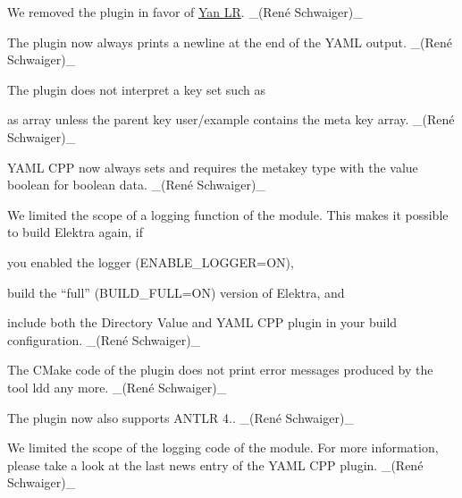 \begin{DoxyItemize}
\item We removed the plugin in favor of \hyperlink{autotoc_md897_src_plugins_yanlr_README_md}{Yan LR}. \+\_\+(René Schwaiger)\+\_\+
\end{DoxyItemize}


\begin{DoxyItemize}
\item The plugin now always prints a newline at the end of the Y\+A\+ML output. \+\_\+(René Schwaiger)\+\_\+
\item The plugin does not interpret a key set such as
\end{DoxyItemize}




as array unless the parent key {\ttfamily user/example} contains the meta key {\ttfamily array}. \+\_\+(René Schwaiger)\+\_\+


\begin{DoxyItemize}
\item Y\+A\+ML C\+PP now always sets and requires the metakey {\ttfamily type} with the value {\ttfamily boolean} for boolean data. \+\_\+(René Schwaiger)\+\_\+
\item We limited the scope of a logging function of the module. This makes it possible to build Elektra again, if
\begin{DoxyItemize}
\item you enabled the logger ({\ttfamily E\+N\+A\+B\+L\+E\+\_\+\+L\+O\+G\+G\+ER=ON}),
\item build the “full” ({\ttfamily B\+U\+I\+L\+D\+\_\+\+F\+U\+LL=ON}) version of Elektra, and
\item include both the Directory Value and Y\+A\+ML C\+PP plugin in your build configuration. \+\_\+(René Schwaiger)\+\_\+
\end{DoxyItemize}
\end{DoxyItemize}


\begin{DoxyItemize}
\item The C\+Make code of the plugin does not print error messages produced by the tool {\ttfamily ldd} any more. \+\_\+(René Schwaiger)\+\_\+
\item The plugin now also supports A\+N\+T\+LR 4.. \+\_\+(René Schwaiger)\+\_\+
\item We limited the scope of the logging code of the module. For more information, please take a look at the last news entry of the Y\+A\+ML C\+PP plugin. \+\_\+(René Schwaiger)\+\_\+
\end{DoxyItemize}



